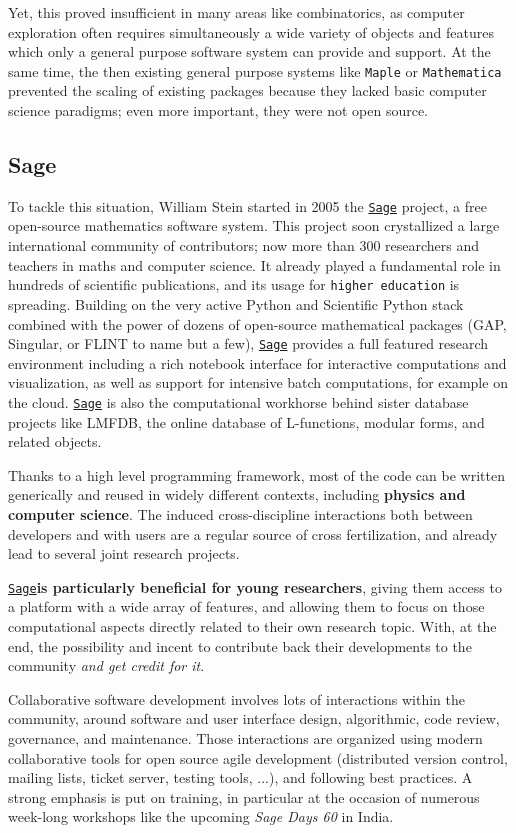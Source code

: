\documentclass[a4,12pt]{amsart}
\newcommand{\sage}{\href{http://www.sagemath.org/}{\texttt{Sage}}\xspace}
\begin{document}
Yet, this proved insufficient in many areas like combinatorics, as
computer exploration often requires simultaneously a wide variety of
objects and features which only a general purpose software system can
provide and support. At the same time, the then existing general
purpose systems like \texttt{Maple} or \texttt{Mathematica} prevented
the scaling of existing packages because they lacked basic computer
science paradigms; even more important, they were not open source.

\subsection*{Sage}

To tackle this situation, William Stein started in 2005 the \sage
project, a free open-source mathematics software system. This project
soon crystallized a large international community of contributors; now
more than 300 researchers and teachers in maths and computer
science. It already played a fundamental role in hundreds of
scientific publications, and its usage for \texttt{higher education}
is spreading.
%
Building on the very active Python and Scientific Python stack
combined with the power of dozens of open-source mathematical packages
(GAP, Singular, or FLINT to name but a few), \sage provides a full
featured research environment including a rich notebook interface for
interactive computations and visualization, as well as support for
intensive batch computations, for example on the cloud. \sage is also
the computational workhorse behind sister database projects like
\textsc{LMFDB}, the online database of L-functions, modular forms, and
related objects.

Thanks to a high level programming framework, most of the code can be
written generically and reused in widely different contexts, including
\textbf{physics and computer science}. The induced cross-discipline
interactions both between developers and with users
are a regular source of cross fertilization, and already lead to
several joint research projects.

\sage \textbf{is particularly beneficial for young researchers},
giving them access to a platform with a wide array of features, and
allowing them to focus on those computational aspects directly related
to their own research topic. With, at the end, the possibility and
incent to contribute back their developments to the community
\emph{and get credit for it}.

Collaborative software development involves lots of interactions
within the community, around software and user interface design,
algorithmic, code review, governance, and maintenance. Those
interactions are organized using modern collaborative tools for open
source agile development (distributed version control, mailing lists,
ticket server, testing tools, ...), and following best practices. A
strong emphasis is put on training, in particular at the occasion of
numerous week-long workshops like the upcoming \emph{Sage Days 60} in
India.
\end{document}
